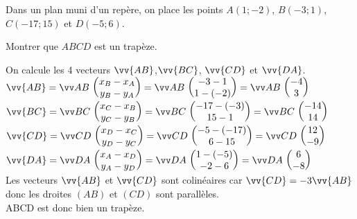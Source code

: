 \documentclass[11pt,a4paper]{article}  %
\begin{document}
\begin{exercice}{}
	Dans un plan muni d'un repère, on place les points $A(1;-2)$, $B(-3;1)$, $C(-17;15)$ et $D(-5;6)$.
	
	Montrer que $ABCD$ est un trapèze.
	\begin{corrBox}
		On calcule les 4 vecteurs $\vv{AB}$,$\vv{BC}$, $\vv{CD}$ et $\vv{DA}$.\\
		$\vv{AB}=\Coord{AB}{x_B-x_A}{y_B-y_A}=\Coord{AB}{-3-1}{1-(-2)}=\Coord{AB}{-4}{3}$\\
		$\vv{BC}=\Coord{BC}{x_C-x_B}{y_C-y_B}=\Coord{BC}{-17-(-3)}{15-1}=\Coord{BC}{-14}{14}$\\
		$\vv{CD}=\Coord{CD}{x_D-x_C}{y_D-y_C}=\Coord{CD}{-5-(-17)}{6-15}=\Coord{CD}{12}{-9}$\\
		$\vv{DA}=\Coord{DA}{x_A-x_D}{y_A-y_D}=\Coord{DA}{1-(-5)}{-2-6}=\Coord{DA}{6}{-8}$\\
		Les vecteurs $\vv{AB}$ et $\vv{CD}$ sont colinéaires car $\vv{CD}=-3\vv{AB}$ donc les droites $(AB)$ et $(CD)$ sont parallèles.\\
		ABCD est donc bien un trapèze. 
	\end{corrBox}
\end{exercice}
\end{document}
